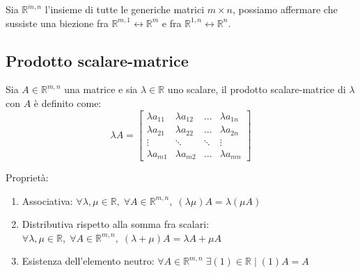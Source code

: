 \documentclass{article}
\begin{document}
    \vspace{10pt}
    Sia $\mathbb{R}^{m, n}$ l'insieme di tutte le generiche matrici $m \times n$, possiamo affermare che sussiste una biezione fra $\mathbb{R}^{m, 1} \leftrightarrow \mathbb{R}^{m}$ e fra $\mathbb{R}^{1, n} \leftrightarrow \mathbb{R}^{n}$.



\subsection{Prodotto scalare-matrice} \label{subsec:matscalarmul}
    Sia $A \in \mathbb{R}^{m, n}$ una matrice e sia $\lambda \in \mathbb{R}$ uno scalare, il prodotto scalare-matrice di $\lambda$ con $A$ è definito come:
    \[
    \lambda A = 
    \begin{bmatrix}
        \lambda a_{11} & \lambda a_{12} & ... & \lambda a_{1n} \\
        \lambda a_{21} & \lambda a_{22} & ... & \lambda a_{2n} \\
        \vdots & \ddots & \ddots & \vdots \\
        \lambda a_{m1} & \lambda a_{m2} & ... & \lambda a_{mn} 
    \end{bmatrix} 
    \]

    \vspace{10pt}
    Proprietà:
    \begin{enumerate}[label=(\arabic*)]
        \item Associativa: $\forall \lambda, \mu \in \mathbb{R}, \; \forall A \in \mathbb{R}^{m, n}, \; (\lambda \mu) A = \lambda (\mu A)$ 
        \item Distributiva rispetto alla somma fra scalari: $\forall \lambda, \mu \in \mathbb{R}, \; \forall A \in \mathbb{R}^{m, n}, \; (\lambda + \mu)A = \lambda A + \mu A$
        \item Esistenza dell'elemento neutro: $\forall A \in \mathbb{R}^{m, n} \; \exists (1) \in \mathbb{R} \; | \; (1)A = A$
    \end{enumerate}
\end{document}
